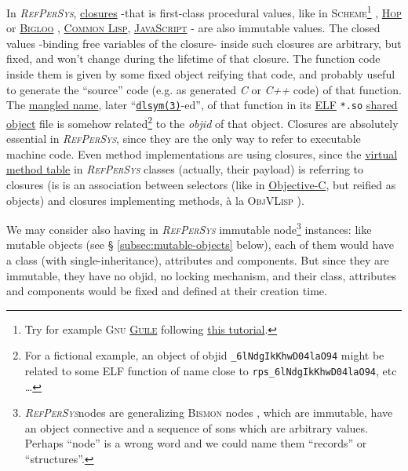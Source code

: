 \documentclass[11pt,a4paper,svgnames]{article}
\newcommand{\RefPerSys}{{\textit{\textsc{RefPerSys}}}}
\begin{document}
In {\RefPerSys},
\href{https://en.wikipedia.org/wiki/Closure_(computer_programming)}{closures}
-that is first-class procedural values, like in
\textsc{Scheme}\footnote{Try for example \textsc{Gnu}
  \href{https://www.gnu.org/software/guile/}{\textsc{Guile}} following
  \href{http://starynkevitch.net/Basile/guile-tutorial-1.html}{this
    tutorial}.} \cite{kelsey:1998:r5rs, matthews:2005:operational,
  Queinnec:1996:LSP, Queinnec:2004:ContinWeb, abelson:1996:sicp},
\href{http://hop.inria.fr/home/index.html}{\textsc{Hop}} or
\href{https://www-sop.inria.fr/mimosa/fp/Bigloo/}{\textsc{Bigloo}}
\cite{serrano:1995:bigloo},
\href{http://www.lispworks.com/documentation/HyperSpec/Front/index.htm}{\textsc{Common
    Lisp}},
\href{https://en.wikipedia.org/wiki/JavaScript}{\textsc{JavaScript}} -
are also immutable values. The closed values -binding free variables
of the closure- inside such closures are arbitrary, but fixed, and
won't change during the lifetime of that closure. The function code
inside them is given by some fixed object reifying that code, and
probably useful to generate the ``source'' code (e.g. as generated
\emph{C} or \emph{C++} code) of that function. The
\href{https://en.wikipedia.org/wiki/Name_mangling}{mangled name},
later
``\href{http://man7.org/linux/man-pages/man3/dlsym.3.html}{\texttt{dlsym(3)}}-ed'',
of that function in its
\href{https://en.wikipedia.org/wiki/Executable_and_Linkable_Format}{ELF}
\texttt{*.so}
\href{https://en.wikipedia.org/wiki/Library\_(computing)\#Shared\_libraries}{shared
  object} file \cite{drepper:2011:write-shared-lib,
  levine:1999:linkers-loaders} is somehow related\footnote{For a
  fictional example, an object of objid \texttt{\_6lNdgIkKhwD04laO94}
  might be related to some ELF function of name close to
  \texttt{rps\_6lNdgIkKhwD04laO94}, etc \ldots} to the \emph{objid} of
that object. Closures are absolutely essential in {\RefPerSys}, since
they are the only way to refer to executable machine code. Even method
implementations are using closures, since the
\href{https://en.wikipedia.org/wiki/Virtual_method_table}{virtual
  method table} in {\RefPerSys} classes (actually, their payload) is
referring to closures (is is an association between selectors (like in
\href{https://en.wikipedia.org/wiki/Objective-C\#Messages}{Objective-C},
but reified as objects) and closures implementing methods, à la
\textsc{ObjVLisp} \cite{cointe:1987:metaclasses,
  abadi:1995:imperative}).

We may consider also having in {\RefPerSys} immutable
node\footnote{\RefPerSys nodes are generalizing \textsc{Bismon} nodes
\cite{Starynkevitch:2019:bismon-draft}, which are immutable, have an
object connective and a sequence of sons which are arbitrary
values. Perhaps ``node'' is a wrong word and we could name them
``records'' or ``structures''.}  instances: like mutable objects (see \S
\ref{subsec:mutable-objects} below), each of them would have a class
(with single-inheritance), attributes and components. But since they
are immutable, they have no objid, no locking mechanism, and their
class, attributes and components would be fixed and defined at their
creation time.
\end{document}
